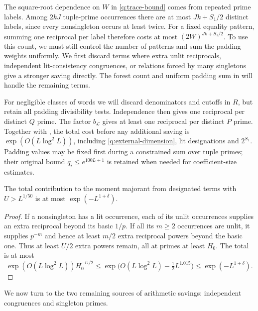 The square-root dependence on $W$ in \eqref{q:trace-bound} comes
from repeated prime labels.  Among $2kJ$ tuple-prime occurrences there
are at most $Jk+S_1/2$ distinct labels, since every nonsingleton occurs
at least twice.  For a fixed equality pattern, summing one reciprocal
per label therefore costs at most $(2W)^{Jk+S_1/2}$.
To use this count, we must still control the number of patterns and
sum the padding weights uniformly.  We first discard terms where
extra unlit reciprocals, independent lit-consistency congruences, or
relations forced by many singletons give a stronger saving directly.
The forest count and uniform padding sum in 
will handle the remaining terms.

For negligible classes of words we will discard denominators and
cutoffs in $R$, but retain all padding divisibility tests.
Independence then gives one reciprocal per distinct $Q$ prime.
The factor $b_{\mathcal L}$ gives at least one reciprocal per distinct
$P$ prime.  Together with , the total cost before
any additional saving is $\exp(O(L\log^2L))$, including
\eqref{q:external-dimension}, lit designations and $2^{S_1}$.
Padding values may be fixed first during a constrained sum over tuple
primes; their original bound $q_i\le e^{100L+1}$ is retained when
needed for coefficient-size estimates.

\begin{lemma}\label{q:many-unlit}
The total contribution to the moment majorant from designated terms
with $U>L^{1/50}$ is at most $\exp(-L^{1+\delta})$.
\end{lemma}

\begin{proof}
If a nonsingleton has a lit occurrence, each of its unlit occurrences
supplies an extra reciprocal beyond its basic $1/p$.
If all its $m\ge2$ occurrences are unlit, it supplies $p^{-m}$ and
hence at least $m/2$ extra reciprocal powers beyond the basic one.
Thus at least $U/2$ extra powers remain, all at primes at least $H_0$.
The total is at most
\[
 \exp(O(L\log^2L))H_0^{-U/2}
 \le\exp\bigl(O(L\log^2L)-\tfrac12L^{1.015}\bigr)
 \le\exp(-L^{1+\delta}).
\]
\end{proof}

We now turn to the two remaining sources of arithmetic savings:
independent congruences and singleton primes.
